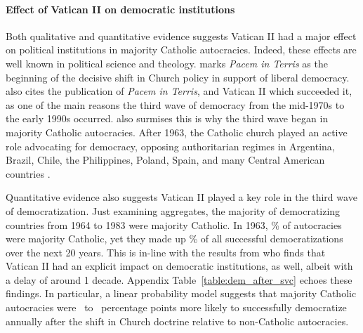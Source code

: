 
\paragraph{Effect of Vatican II on democratic institutions}

\label{par:pol_cond_eff_beg}
Both qualitative and quantitative evidence suggests Vatican II had a major effect on political institutions in majority Catholic autocracies. Indeed, these effects are well known in political science and theology. \cite{Sigmund1987} marks \emph{Pacem in Terris} as the beginning of the decisive shift in Church policy in support of liberal democracy. \cite{Huntington1991} also cites the publication of \textit{Pacem in Terris}, and Vatican II which succeeded it, as one of the main reasons the third wave of democracy from the mid-1970s to the early 1990s occurred. \citeauthor{Huntington1991} also surmises this is why the third wave began in majority Catholic autocracies. After 1963, the Catholic church played an active role advocating for democracy, opposing authoritarian regimes in Argentina, Brazil, Chile, the Philippines, Poland, Spain, and many Central American countries \citep{Huntington1991,Fukuyama1992,Andersen2019}.

Quantitative evidence also suggests Vatican II played a key role in the third wave of democratization. Just examining aggregates, the majority of democratizing countries from 1964 to 1983 were majority Catholic. In 1963, \pctAutMajCatholic\% of autocracies were majority Catholic, yet they made up \pctMajCatholicSucc\% of all successful democratizations over the next 20 years. This is in-line with the results from \cite{Andersen2019} who finds that Vatican II had an explicit impact on democratic institutions, as well, albeit with a delay of around 1 decade. Appendix Table~\ref{table:dem_after_svc} echoes these findings. In particular, a linear probability model suggests that majority Catholic autocracies were \tabCSevenSuccLow\ to \tabCSevenSuccHigh\ percentage points more likely to successfully democratize annually after the shift in Church doctrine relative to non-Catholic autocracies.

